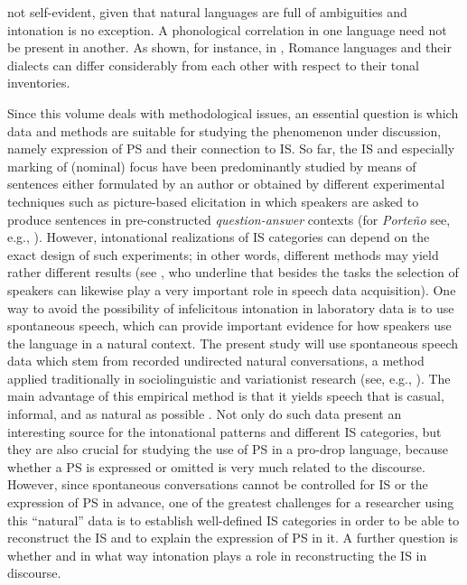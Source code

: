 \documentclass[output=paper]{langsci/langscibook}
\begin{document}
not self-evident, given that natural languages are full of ambiguities and intonation is no exception. A phonological correlation in one language need not be present in another. As shown, for instance, in \citet{frotaPrieto2015}, Romance languages and their dialects can differ considerably from each other with respect to their tonal inventories.\largerpage

Since this volume deals with methodological issues, an essential question is which data and methods are suitable for studying the phenomenon under discussion, namely expression of PS and their connection to IS. So far, the IS and especially marking of (nominal) focus have been predominantly studied by means of sentences either formulated by an author or obtained by different experimental techniques such as picture-based elicitation in which speakers are asked to produce sentences in pre-constructed \textit{question-answer} contexts (for \textit{Porte{\~n}o} see, e.g., \citealt{Gabriel2010article}). However, intonational realizations of IS categories can depend on the exact design of such experiments; in other words, different methods may yield rather different results (see \citealt{Niebuhr2015}, who underline that besides the tasks the selection of speakers can likewise play a very important role in speech data acquisition). One way to avoid the possibility of infelicitous intonation in laboratory data is to use spontaneous speech, which can provide important evidence for how speakers use the language in a natural context. The present study will use spontaneous speech data which stem from recorded undirected natural conversations, a method applied traditionally in sociolinguistic and variationist research (see, e.g., \citealt{Labov1984,SilvaCorvalan.2001}). The main advantage of this empirical method is that it yields speech that is casual, informal, and as natural as possible \citep[52]{SilvaCorvalan.2001}. Not only do such data present an interesting source for the intonational patterns and different IS categories, but they are also crucial for studying the use of PS in a pro-drop language, because whether a PS is expressed or omitted is very much related to the discourse. However, since spontaneous conversations cannot be controlled for IS or the expression of PS in advance, one of the greatest challenges for a researcher using this ``natural'' data is to establish well-defined IS categories in order to be able to reconstruct the IS and to explain the expression of PS in it. A further question is whether and in what way intonation plays a role in reconstructing the IS in discourse.
\end{document}

